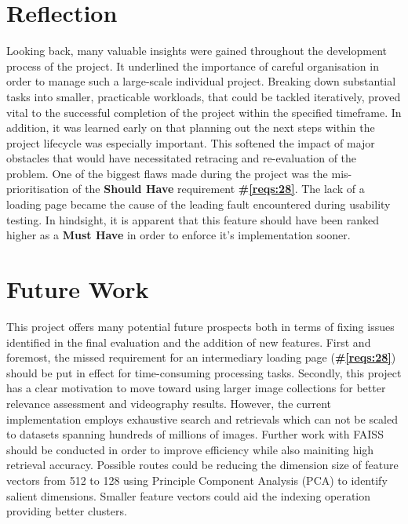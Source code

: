 \documentclass{l4proj}
\begin{document}
\section{Reflection}
Looking back, many valuable insights were gained throughout the development process of the project. It underlined the importance of careful organisation in order to manage such a large-scale individual project. Breaking down substantial tasks into smaller, practicable workloads, that could be tackled iteratively, proved vital to the successful completion of the project within the specified timeframe. In addition, it was learned early on that planning out the next steps within the project lifecycle was especially important. This softened the impact of major obstacles that would have necessitated retracing and re-evaluation of the problem. One of the biggest flaws made during the project was the mis-prioritisation of the \textbf{Should Have} requirement \textbf{\#\ref{reqs:28}}. The lack of a loading page became the cause of the leading fault encountered during usability testing. In hindsight, it is apparent that this feature should have been ranked higher as a \textbf{Must Have} in order to enforce it's implementation sooner.


\section{Future Work}
\label{sec:future_work}
This project offers many potential future prospects both in terms of fixing issues identified in the final evaluation and the addition of new features. First and foremost, the missed requirement for an intermediary loading page (\textbf{\#\ref{reqs:28}}) should be put in effect for time-consuming processing tasks. Secondly, this project has a clear motivation to move toward using larger image collections for better relevance assessment and videography results. However, the current implementation employs exhaustive search and retrievals which can not be scaled to datasets spanning hundreds of millions of images. Further work with FAISS should be conducted in order to improve efficiency while also mainiting high retrieval accuracy. Possible routes could be reducing the dimension size of feature vectors from 512 to 128 using Principle Component Analysis (PCA) to identify salient dimensions. Smaller feature vectors could aid the indexing operation providing better clusters.
\end{document}
